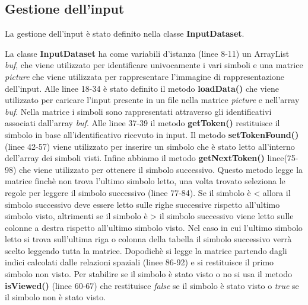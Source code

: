 \subsection{Gestione dell'input}
La gestione dell'input è stato definito nella classe \textbf{InputDataset}.

La classe \textbf{InputDataset} ha come variabili d'istanza (linee 8-11) un ArrayList \textit{buf}, che viene utilizzato per identificare univocamente i vari simboli e una matrice \textit{picture} che viene utilizzata per rappresentare l'immagine di rappresentazione dell'input. Alle linee 18-34 è stato definito il metodo \textbf{loadData()} che viene utilizzato per caricare l'input presente in un file nella matrice \textit{picture} e nell'array \textit{buf}. Nella matrice i simboli sono rappresentati attraverso gli identificativi associati dall'array \textit{buf}. Alle linee 37-39 il metodo \textbf{getToken()} restituisce il simbolo in base all'identificativo ricevuto in input. Il metodo \textbf{setTokenFound()} (linee 42-57) viene utilizzato per inserire un simbolo che è stato letto all'interno dell'array dei simboli visti. Infine abbiamo il metodo \textbf{getNextToken()} linee(75-98) che viene utilizzato per ottenere il simbolo successivo. Questo metodo legge la matrice finchè non trova l'ultimo simbolo letto, una volta trovato seleziona le regole per leggere il simbolo successivo (linee 77-84). Se il simbolo è < allora il simbolo successivo deve essere letto sulle righe successive rispetto all'ultimo simbolo visto, altrimenti se il simbolo è > il simbolo successivo viene letto sulle colonne a destra rispetto all'ultimo simbolo visto. Nel caso in cui l'ultimo simbolo letto si trova sull'ultima riga o colonna della tabella il simbolo successivo verrà scelto leggendo tutta la matrice. Dopodichè si legge la matrice partendo dagli indici calcolati dalle relazioni spaziali (linee 86-92) e si restituisce il primo simbolo non visto. Per stabilire se il simbolo è stato visto o no si usa il metodo \textbf{isViewed()} (linee 60-67) che restituisce \textit{false} se il simbolo è stato visto o \textit{true} se il simbolo non è stato visto.
